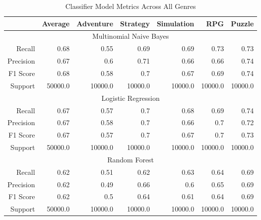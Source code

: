 \begin{table}[h]
    \centering
    \begin{tabular}{r|r|r|r|r|r|r}
        & Average & Adventure & Strategy & Simulation & RPG & Puzzle \\\hline
        \multicolumn{7}{c}{Multinomial Naive Bayes} \\\hline
        Recall      & 0.68 & 0.55 & 0.69 & 0.69 & 0.73 & 0.73 \\
        Precision   & 0.67 & 0.6 & 0.71 & 0.66 & 0.66 & 0.74 \\
        F1 Score    & 0.68 & 0.58 & 0.7 & 0.67 & 0.69 & 0.74 \\
        Support     & 50000.0 & 10000.0 & 10000.0 & 10000.0 & 10000.0 & 10000.0 \\\hline
        \multicolumn{7}{c}{Logistic Regression} \\\hline
        Recall      & 0.67 & 0.57 & 0.7 & 0.68 & 0.69 & 0.74 \\
        Precision   & 0.67 & 0.58 & 0.7 & 0.66 & 0.7 & 0.72 \\
        F1 Score    & 0.67 & 0.57 & 0.7 & 0.67 & 0.7 & 0.73 \\
        Support     & 50000.0 & 10000.0 & 10000.0 & 10000.0 & 10000.0 & 10000.0 \\\hline
        \multicolumn{7}{c}{Random Forest} \\\hline
        Recall      & 0.62 & 0.51 & 0.62 & 0.63 & 0.64 & 0.69 \\
        Precision   & 0.62 & 0.49 & 0.66 & 0.6 & 0.65 & 0.69 \\
        F1 Score    & 0.62 & 0.5 & 0.64 & 0.61 & 0.64 & 0.69 \\
        Support     & 50000.0 & 10000.0 & 10000.0 & 10000.0 & 10000.0 & 10000.0 \\\hline
    \end{tabular}
    \caption{Classifier Model Metrics Across All Genres}
    \label{tab:combined_model_metrics}
\end{table}